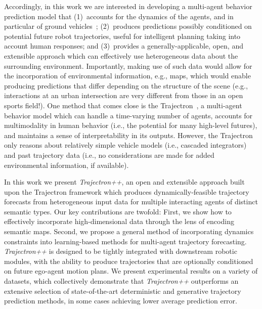 \documentclass[runningheads]{llncs}
\newcommand{\algname}{\mbox{Trajectron++}}
\newcommand{\emphalgname}{\emph{\algname}}
\begin{document}
Accordingly, in this work we are interested in developing a multi-agent behavior prediction model that 
(1)~accounts for the dynamics of the agents, and in particular of ground vehicles~\cite{KongPfeiferEtAl2015,PadenCapEtAl2016};
(2)~produces predictions possibly conditioned on potential future robot trajectories, useful for intelligent planning taking into account human responses; and
(3)~provides a generally-applicable, open, and extensible approach which can effectively use heterogeneous data about the surrounding environment.
Importantly, making use of such data would allow for the incorporation of environmental information, e.g., maps, which would enable producing predictions that differ depending on the structure of the scene (e.g., interactions at an urban intersection are very different from those in an open sports field!).
One method that comes close is the Trajectron~\cite{IvanovicPavone2019}, a multi-agent behavior model which can handle a time-varying number of agents, accounts for multimodality in human behavior (i.e., the potential for many high-level futures), and maintains a sense of interpretability in its outputs.
However, the Trajectron only reasons about relatively simple vehicle models (i.e., cascaded integrators) and past trajectory data (i.e., no considerations are made for added environmental information, if available).


In this work we present \emphalgname{}, an open and extensible approach built upon the Trajectron \cite{IvanovicPavone2019} framework which produces dynamically-feasible trajectory forecasts from heterogeneous input data for multiple interacting agents of distinct semantic types.
Our key contributions are twofold: First, we show how to effectively incorporate high-dimensional data
through the lens of encoding semantic maps. Second, we propose a general method of incorporating dynamics constraints into learning-based methods for multi-agent trajectory forecasting.
\emphalgname{} is designed to be tightly integrated with downstream robotic modules,
with the ability to produce trajectories
that are optionally conditioned on future ego-agent motion plans.
We present experimental results on a variety of datasets, which collectively demonstrate that \emphalgname{} outperforms an extensive selection of state-of-the-art deterministic and generative trajectory prediction methods, in some cases achieving  lower average prediction error.
\end{document}
